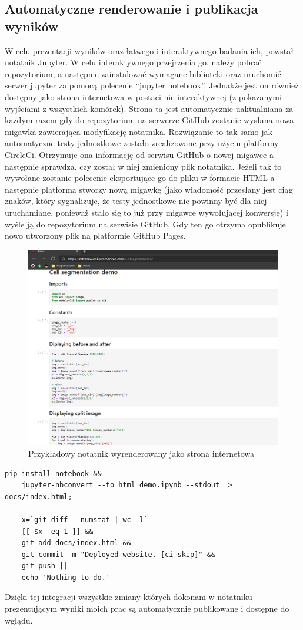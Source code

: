\documentclass{article}
\begin{document}
\subsection{Automatyczne renderowanie i publikacja wyników}
W celu prezentacji wyników oraz łatwego i interaktywnego badania ich, powstał notatnik Jupyter.
W celu interaktywnego przejrzenia go, należy pobrać repozytorium, a następnie zainstalować wymagane biblioteki oraz uruchomić serwer jupyter za pomocą polecenie ``jupyter notebook''.
Jednakże jest on również dostępny jako strona internetowa w postaci nie interaktywnej (z pokazanymi wyjściami z wszystkich komórek).
Strona ta jest automatycznie uaktualniana za każdym razem gdy do repozytorium na serwerze GitHub zostanie wysłana nowa migawka zawierająca modyfikację notatnika.
Rozwiązanie to tak samo jak automatyczne testy jednostkowe zostało zrealizowane przy użyciu platformy CircleCi.
Otrzymuje ona informację od serwisu GitHub o nowej migawce a następnie sprawdza, czy został w niej zmieniony plik notatnika.
Jeżeli tak to wywołane zostanie polecenie eksportujące go do pliku w formacie HTML a następnie platforma stworzy nową migawkę (jako wiadomość przesłany jest ciąg znaków, który sygnalizuje, że testy jednostkowe nie powinny być dla niej uruchamiane, ponieważ stało się to już przy migawce wywołującej konwersję) i wyśle ją do repozytorium na serwisie GitHub.
Gdy ten go otrzyma opublikuje nowo utworzony plik na platformie GitHub Pages.
\begin{figure}[H]
    \centering
    \includegraphics[width=\linewidth]{images/jupyter.png}
    \caption{Przykładowy notatnik wyrenderowany jako strona internetowa}
\end{figure}
\begin{lstlisting}[caption='Kod odpowiedzialny za konwersję notatnika do pliku html oraz jego warunkową publikację ']
    pip install notebook &&
    jupyter-nbconvert --to html demo.ipynb --stdout  > docs/index.html;

    x=`git diff --numstat | wc -l`
    [[ $x -eq 1 ]] &&
    git add docs/index.html &&
    git commit -m "Deployed website. [ci skip]" &&
    git push ||
    echo 'Nothing to do.'
\end{lstlisting}
Dzięki tej integracji wszystkie zmiany których dokonam w notatniku prezentującym wyniki moich prac są automatycznie publikowane i dostępne do wglądu.
\end{document}

